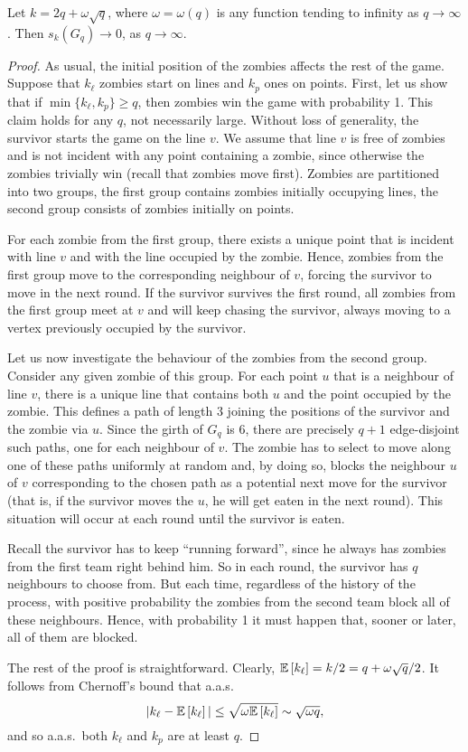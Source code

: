 \documentclass[12pt]{amsart}
\begin{document}
\begin{lemma}\label{lem1}
Let $k = 2q + \omega \sqrt{q}$, where $\omega = \omega(q)$ is any function tending to infinity as $q\to \infty$. Then $s_k(G_q) \to 0$, as $q \to \infty$.
\end{lemma}
\begin{proof}
As usual, the initial position of the zombies affects the rest of the game. Suppose that $k_\ell$ zombies start on lines and $k_p$ ones on points. First, let us show that if $\min\{k_\ell, k_p\} \ge q$,
then zombies win the game with probability 1. This claim holds for any $q$, not necessarily large. Without loss of generality, the survivor starts the game on the line $v$. We assume that line $v$ is free of
zombies and is not incident with any point containing a zombie, since otherwise the zombies trivially win (recall that zombies move first). Zombies are partitioned into two groups, the first group contains zombies initially occupying lines, the second group consists of zombies initially on points.

For each zombie from the first group, there exists a unique point that is incident with line $v$ and with the line occupied by the zombie. Hence, zombies from the first group move to the corresponding
neighbour of $v$, forcing the survivor to move in the next round. If the survivor survives the first round, all zombies from the first group meet at $v$ and will keep chasing the survivor, always moving to a vertex previously
occupied by the survivor.

Let us now investigate the behaviour of the zombies from the second group. Consider any given zombie of this group. For each point $u$ that is a neighbour of line $v$, there is a unique line that contains
both $u$ and the point occupied by the zombie.
This defines a path of length $3$ joining the positions of the survivor and the zombie via $u$.
Since the girth of $G_q$ is 6, there are precisely $q+1$ edge-disjoint such paths, one for each neighbour of $v$.
The zombie has to select to move along one of these paths uniformly at random and, by doing so, blocks the neighbour $u$ of $v$ corresponding to the chosen path as a potential next move for the survivor (that is, if the survivor moves the $u$, he will get eaten in the next round). This situation will occur at each round until the survivor is eaten.

Recall the survivor has to keep ``running forward'', since he always has zombies from the first team right behind him. So in each round, the survivor has $q$ neighbours to choose from. But
each time, regardless of the history of the process, with positive probability the zombies from the second team block all of these neighbours. Hence, with probability 1 it must happen that, sooner or later, all of
them are blocked.

The rest of the proof is straightforward. Clearly, $\mathbb{E}\left[k_\ell \right] = k/2 = q + \omega \sqrt{q} / 2$. It follows from Chernoff's bound that a.a.s.\
$$
| k_{\ell} - \mathbb{E}\left[k_\ell \right] | \le \sqrt{\omega \mathbb{E}\left[k_\ell \right]} \sim \sqrt{\omega q},
$$
and so a.a.s.\ both $k_{\ell}$ and $k_p$ are at least $q$.
\end{proof}
\end{document}
